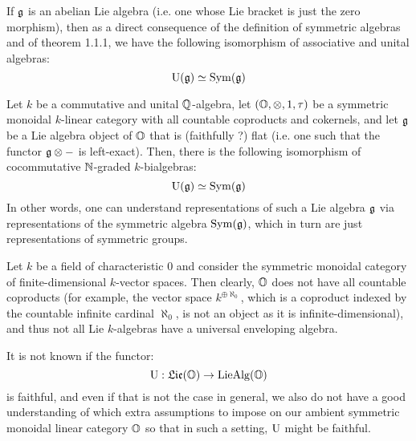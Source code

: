                 \begin{example}
                    If $\mathfrak{g}$ is an abelian Lie algebra (i.e. one whose Lie bracket is just the zero morphism), then as a direct consequence of the definition of symmetric algebras and of theorem 1.1.1, we have the following isomorphism of associative and unital algebras:
                        $$\mathrm{U}(\mathfrak{g}) \simeq \mathrm{Sym}(\mathfrak{g})$$
                \end{example}
                \begin{example}
                    Let $k$ be a commutative and unital $\mathbb{Q}$-algebra, let $(\O, \tensor, 1, \tau)$ be a symmetric monoidal $k$-linear category with all countable coproducts and cokernels, and let $\mathfrak{g}$ be a Lie algebra object of $\mathbb{O}$ that is (faithfully ?) flat (i.e. one such that the functor $\g \tensor -$ is left-exact). Then, there is the following isomorphism of cocommutative $\mathbb{N}$-graded $k$-bialgebras:
                        $$\mathrm{U}(\mathfrak{g}) \simeq \mathrm{Sym}(\mathfrak{g})$$
                    In other words, one can understand representations of such a Lie algebra $\mathfrak{g}$ via representations of the symmetric algebra $\mathrm{Sym}(\mathfrak{g})$, which in turn are just representations of symmetric groups.
                \end{example}
                \begin{example}
                    Let $k$ be a field of characteristic $0$ and consider the symmetric monoidal category of finite-dimensional $k$-vector spaces. Then clearly, $\mathbb{O}$ does not have all countable coproducts (for example, the vector space $k^{\oplus \aleph_0}$, which is a coproduct indexed by the countable infinite cardinal $\aleph_0$, is not an object as it is infinite-dimensional), and thus not all Lie $k$-algebras have a universal enveloping algebra.
                \end{example}
                \begin{example}
                    It is not known if the functor:
                        $$\mathrm{U}: \mathfrak{Lie}(\mathbb{O}) \to \mathrm{Lie}\mathrm{Alg}(\mathbb{O})$$
                    is faithful, and even if that is not the case in general, we also do not have a good understanding of which extra assumptions to impose on our ambient symmetric monoidal linear category $\mathbb{O}$ so that in such a setting, $\mathrm{U}$ might be faithful. 
                \end{example}
                
